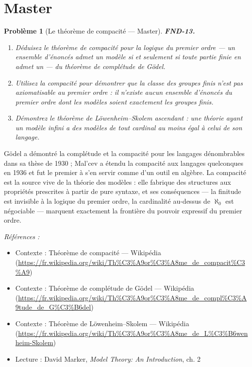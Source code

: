 \documentclass[11pt]{article}
\newtheorem{problem}{Problème}
\newenvironment{refs}{\par\small\noindent\emph{Références :}\begin{itemize}\setlength\itemsep{0pt}}{\end{itemize}\normalsize}
\begin{document}
\bigskip


\section*{Master}

\begin{problem}[{Le théorème de compacité --- Master}]
\textbf{FND-13.} \begin{enumerate}
\item[(a)] Déduisez le théorème de compacité pour la logique du premier ordre
--- un ensemble d'énoncés admet un modèle si et seulement si toute partie finie en admet un --- du
théorème de complétude de Gödel.
\item[(b)] Utilisez la compacité pour démontrer que la classe des groupes finis n'est pas
axiomatisable au premier ordre : il n'existe aucun ensemble d'énoncés du premier ordre dont les
modèles soient exactement les groupes finis.
\item[(c)] Démontrez le théorème de Löwenheim--Skolem ascendant : une théorie ayant un
modèle infini a des modèles de tout cardinal au moins égal à celui de son langage.
\end{enumerate}

\end{problem}

\noindent Gödel a démontré la complétude et la compacité pour les langages dénombrables
dans sa thèse de 1930 ; Mal'cev a étendu la compacité aux langages quelconques en 1936 et fut le
premier à s'en servir comme d'un outil en algèbre. La compacité est la source vive de la théorie
des modèles : elle fabrique des structures aux propriétés prescrites à partir de pure syntaxe, et
ses conséquences --- la finitude est invisible à la logique du premier ordre, la cardinalité
au-dessus de $ \aleph_0 $ est négociable --- marquent exactement la frontière du pouvoir
expressif du premier ordre.

\begin{refs}
\item Contexte : Théorème de compacité --- Wikipédia (\url{https://fr.wikipedia.org/wiki/Th%C3%A9or%C3%A8me_de_compacit%C3%A9})
\item Contexte : Théorème de complétude de Gödel --- Wikipédia (\url{https://fr.wikipedia.org/wiki/Th%C3%A9or%C3%A8me_de_compl%C3%A9tude_de_G%C3%B6del})
\item Contexte : Théorème de Löwenheim--Skolem --- Wikipédia (\url{https://fr.wikipedia.org/wiki/Th%C3%A9or%C3%A8me_de_L%C3%B6wenheim-Skolem})
\item Lecture : David Marker, \textit{Model Theory: An Introduction}, ch. 2
\end{refs}
\end{document}
